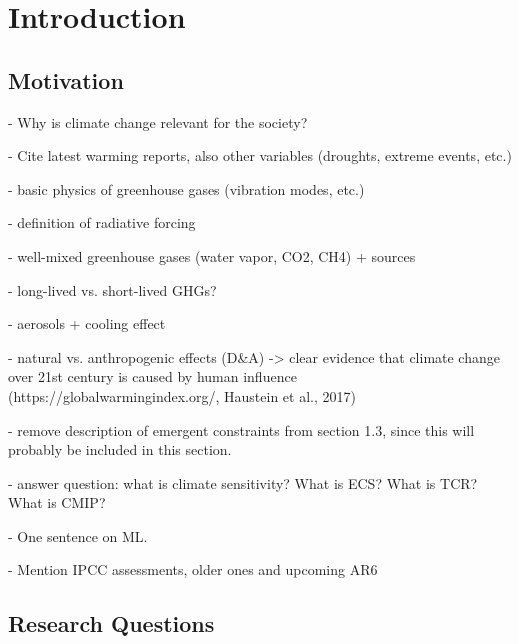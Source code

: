 


\chapter{Introduction}
\label{ch:01:introduction}


\section{Motivation}
\label{sec:01:motivation}

- Why is climate change relevant for the society?

- Cite latest warming reports, also other variables (droughts, extreme events,
etc.)

- basic physics of greenhouse gases (vibration modes, etc.)

- definition of radiative forcing

- well-mixed greenhouse gases (water vapor, CO2, CH4) + sources

- long-lived vs. short-lived GHGs?

- aerosols + cooling effect

- natural vs. anthropogenic effects (D\&A) -> clear evidence that climate
change over 21st century is caused by human influence
(https://globalwarmingindex.org/, Haustein et al., 2017)

- remove description of emergent constraints from section 1.3, since this will
probably be included in this section.

- answer question: what is climate sensitivity? What is \ac{ECS}? What is
\ac{TCR}? What is \ac{CMIP}?

- One sentence on \ac{ML}.

- Mention IPCC assessments, older ones and upcoming AR6


\section{Research Questions}
\label{sec:01:research_questions}

